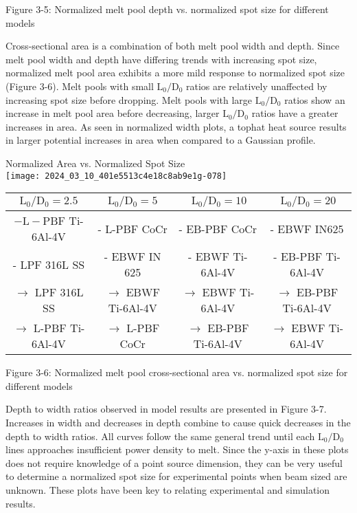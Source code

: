\documentclass[10pt]{article}
\begin{document}
Figure 3-5: Normalized melt pool depth vs. normalized spot size for different models

Cross-sectional area is a combination of both melt pool width and depth. Since melt pool width and depth have differing trends with increasing spot size, normalized melt pool area exhibits a more mild response to normalized spot size (Figure 3-6). Melt pools with small $\mathrm{L}_{0} / \mathrm{D}_{0}$ ratios are relatively unaffected by increasing spot size before dropping. Melt pools with large $\mathrm{L}_{0} / \mathrm{D}_{0}$ ratios show an increase in melt pool area before decreasing, larger $\mathrm{L}_{0} / \mathrm{D}_{0}$ ratios have a greater increases in area. As seen in normalized width plots, a tophat heat source results in larger potential increases in area when compared to a Gaussian profile.

Normalized Area vs. Normalized Spot Size\\
\texttt{[image: 2024\_03\_10\_401e5513c4e18c8ab9e1g-078]}

\begin{center}
\begin{tabular}{c|c|c|c|}
\hline
$\mathrm{L}_{0} / \mathrm{D}_{0}=2.5$ & \multicolumn{1}{|c}{$\mathrm{L}_{0} / \mathrm{D}_{0}=5$} & $\mathrm{~L}_{0} / \mathrm{D}_{0}=10$ & $\mathrm{~L}_{0} / \mathrm{D}_{0}=20$ \\
\hline
$-\mathrm{L}-\mathrm{PBF}$ Ti-6Al-4V & - L-PBF CoCr & - EB-PBF CoCr & - EBWF IN625 \\
- LPF 316L SS & - EBWF IN 625 & - EBWF Ti-6Al-4V & - EB-PBF Ti-6Al-4V \\
$\rightarrow$ LPF 316L SS & $\rightarrow$ EBWF Ti-6Al-4V & $\longrightarrow$ EBWF Ti-6Al-4V & $\rightarrow$ EB-PBF Ti-6Al-4V \\
$\rightarrow$ L-PBF Ti-6Al-4V & $\rightarrow$ L-PBF CoCr & $\longrightarrow$ EB-PBF Ti-6Al-4V & $\longrightarrow$ EBWF Ti-6Al-4V \\
\hline
\end{tabular}
\end{center}

Figure 3-6: Normalized melt pool cross-sectional area vs. normalized spot size for different models

Depth to width ratios observed in model results are presented in Figure 3-7. Increases in width and decreases in depth combine to cause quick decreases in the depth to width ratios. All curves follow the same general trend until each $\mathrm{L}_{0} / \mathrm{D}_{0}$ lines approaches insufficient power density to melt. Since the y-axis in these plots does not require knowledge of a point source dimension, they can be very useful to determine a normalized spot size for experimental points when beam sized are unknown. These plots have been key to relating experimental and simulation results.
\end{document}
